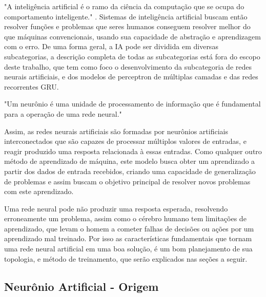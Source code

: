 "A inteligência artificial é o ramo da ciência da computação que se ocupa do comportamento inteligente." \cite{Luger2004}. Sistemas de inteligência artificial buscam então resolver funções e problemas que seres humanos conseguem resolver melhor do que máquinas convencionais, usando sua capacidade de abstração e aprendizagem com o erro. De uma forma geral, a IA pode ser dividida em diversas subcategorias, a descrição completa de todas as subcategorias está fora do escopo deste trabalho, que tem como foco o desenvolvimento da subcategoria de redes neurais artificiais, e dos modelos de perceptron de múltiplas camadas e das redes recorrentes GRU.

"Um neurônio é uma unidade de processamento de informação que é fundamental para a operação de uma rede neural."\cite{Haykin1994} 

Assim, as redes neurais artificiais são formadas por neurônios artificiais interconectados que são capazes de processar múltiplos valores de entradas, e reagir produzido uma resposta relacionada à essas entradas. Como qualquer outro método de aprendizado de máquina, este modelo busca obter um aprendizado a partir dos dados de entrada recebidos, criando uma capacidade de generalização de problemas e assim buscam o objetivo principal de resolver novos problemas com este aprendizado.

Uma rede neural pode não produzir uma resposta esperada, resolvendo erroneamente um problema, assim como o cérebro humano tem limitações de aprendizado, que levam o homem a cometer falhas de decisões ou ações por um aprendizado mal treinado. Por isso as características fundamentais que tornam uma rede neural artificial em uma boa solução, é um bom planejamento de sua topologia, e método de treinamento, que serão explicados nas seções a seguir.

\subsection{Neurônio Artificial - Origem}
